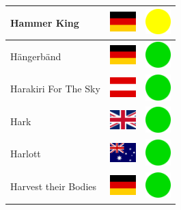 \documentclass[12pt, a4paper, twoside]{report}
\begin{document}
\begin{center}
\begin{longtable}{|p{5cm}|p{2cm}|p{2cm}|}
Hammer King & \includegraphics[width=1cm]{4x3/de} & \includegraphics[width=1cm]{likes/m} \\ \hline
Hängerbänd & \includegraphics[width=1cm]{4x3/de} & \includegraphics[width=1cm]{likes/y} \\ \hline
Harakiri For The Sky & \includegraphics[width=1cm]{4x3/at} & \includegraphics[width=1cm]{likes/y} \\ \hline
Hark & \includegraphics[width=1cm]{4x3/gb} & \includegraphics[width=1cm]{likes/y} \\ \hline
Harlott & \includegraphics[width=1cm]{4x3/au} & \includegraphics[width=1cm]{likes/y} \\ \hline
Harvest their Bodies & \includegraphics[width=1cm]{4x3/de} & \includegraphics[width=1cm]{likes/y} \\ \hline

\end{longtable}
\end{center}
\end{document}
